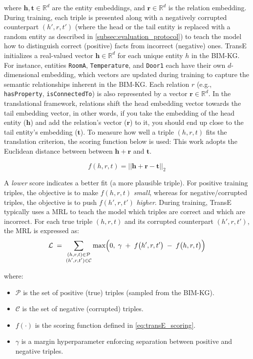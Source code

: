 \begin{enumerate}
where $\mathbf{h}, \mathbf{t} \in \mathbb{R}^d$ are the entity embeddings, and $\mathbf{r} \in \mathbb{R}^d$ is the relation embedding. During training, each triple is presented along with a negatively corrupted counterpart $(h', r, t')$ (where the head or the tail entity is replaced with a random entity as described in \autoref{subsec:evaluation_protocol}) to teach the model how to distinguish correct (positive) facts from incorrect (negative) ones. TransE initializes a real-valued vector $\mathbf{h} \in \mathbb{R}^d$ for each unique entity $h$ in the BIM-KG. For instance, entities \texttt{RoomA}, \texttt{Temperature}, and \texttt{Door1} each have their own $d$-dimensional embedding, which vectors are updated during training to capture the semantic relationships inherent in the \ac{BIM-KG}. Each relation $r$ (e.g., \texttt{hasProperty}, \texttt{isConnectedTo}) is also represented by a vector $\mathbf{r} \in \mathbb{R}^d$. In the translational framework, relations shift the head embedding vector towards the tail embedding vector, in other words, if you take the embedding of the head entity ($\mathbf{h}$) and add the relation's vector ($\mathbf{r}$) to it, you should end up close to the tail entity's embedding ($\mathbf{t}$). To measure how well a triple $(h, r, t)$ fits the translation criterion, the scoring function below is used: This work adopts the Euclidean distance between between $\mathbf{h} + \mathbf{r}$ and $\mathbf{t}$.

\begin{equation}
\label{eq:transE_scoring}
        f(h, r, t) = ||\mathbf{h} + \mathbf{r} - \mathbf{t}||_2
    \end{equation}

A \emph{lower} score indicates a better fit (a more plausible triple). For positive training triples, the objective is to make $f(h, r, t)$ \emph{small}, whereas for negative/corrupted triples, the objective is to push $f(h', r, t')$ \emph{higher}. During training, TransE typically uses a \acf{MRL} to teach the model which triples are correct and which are incorrect. For each true triple $(h,r,t)$ and its corrupted counterpart $(h',r,t')$, the \ac{MRL} is expressed as:
\begin{equation}
\mathcal{L} \;=\; \sum_{\substack{(h,r,t) \in \mathcal{P} \\ (h',r,t') \in \mathcal{C}}} \max\Bigl(0,\;\gamma \;+\; f\bigl(h',r,t'\bigr) \;-\; f\bigl(h,r,t\bigr)\Bigr)
\end{equation}

where:
\begin{itemize}
    \item $\mathcal{P}$ is the set of positive (true) triples (sampled from the \ac{BIM-KG}).
    \item $\mathcal{C}$ is the set of negative (corrupted) triples.
    \item $f(\cdot)$ is the scoring function defined in \autoref{eq:transE_scoring}.
    \item $\gamma$ is a margin hyperparameter enforcing separation between positive and negative triples.
\end{itemize}


\end{enumerate}
